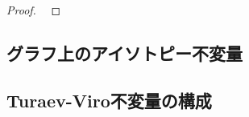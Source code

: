 \documentclass[TQFT_main]{subfiles}
\begin{document}
\begin{proof}
    ~\cite[Theorem 11.5, p.250]{Turaev2017}
\end{proof}




    

\subsection{グラフ上のアイソトピー不変量}



\subsection{Turaev-Viro不変量の構成}
\end{document}

